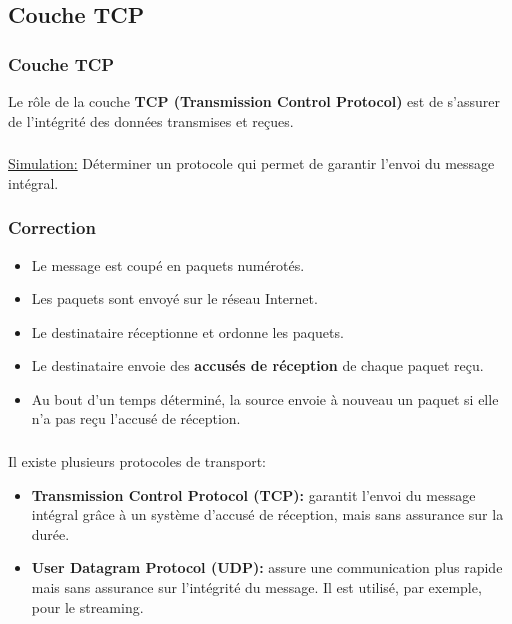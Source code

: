 \documentclass[svgnames,11pt]{beamer}
\begin{document}
\subsection{Couche TCP}
\begin{frame}
    \frametitle{Couche TCP}


    \begin{aretenir}[]
        Le rôle de la couche \textbf{TCP (Transmission Control Protocol)} est de s'assurer de l'intégrité des données transmises et reçues.
    \end{aretenir}

\end{frame}

\begin{frame}
    \frametitle{}

    \begin{activite}
        \underline{Simulation:} Déterminer un protocole qui permet de garantir l'envoi du message intégral.
    \end{activite}

\end{frame}
\begin{frame}
    \frametitle{Correction}

    \begin{itemize}
        \item<1-> Le message est coupé en paquets numérotés.
        \item<2-> Les paquets sont envoyé sur le réseau Internet.
        \item<3-> Le destinataire réceptionne et ordonne les paquets.
        \item<4-> Le destinataire envoie des \textbf{accusés de réception} de chaque paquet reçu.
        \item<5-> Au bout d'un temps déterminé, la source envoie à nouveau un paquet si elle n'a pas reçu l'accusé de réception.
    \end{itemize}
\end{frame}
\begin{frame}
    \frametitle{}

    \begin{aretenir}
        Il existe plusieurs protocoles de transport:
    \begin{itemize}
        \item \textbf{Transmission Control Protocol (TCP):} garantit l'envoi du message intégral grâce à un système d'accusé de réception, mais sans assurance sur la durée.
        \item \textbf{User Datagram Protocol (UDP):} assure une communication plus rapide mais sans assurance sur l'intégrité du message. Il est utilisé, par exemple, pour le streaming.
    \end{itemize}
    \end{aretenir}

\end{frame}
\end{document}
